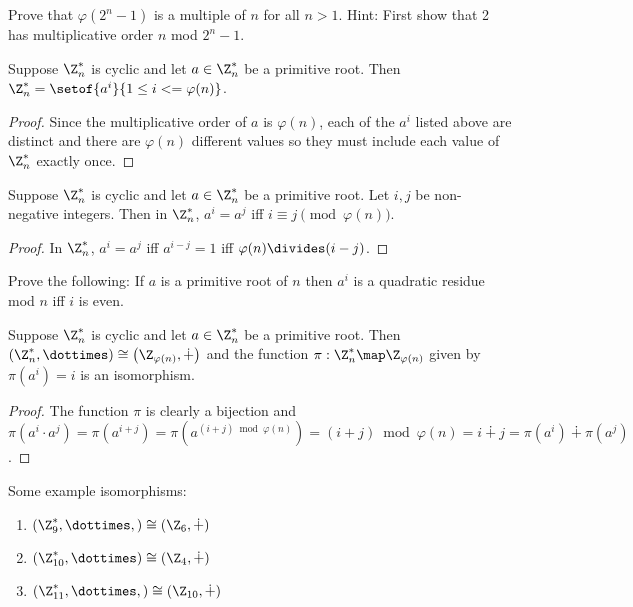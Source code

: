 \documentclass[oneside,12pt]{amsart}
\begin{document}
\begin{homework}
Prove that $\varphi(2^n-1)$ is a multiple of $n$ for all $n>1$.
Hint: First show that 2 has multiplicative order $n$ mod $2^n-1$.
\end{homework}


\begin{lemma}
Suppose $\Z^*_n$ is cyclic and let $a\in\Z^*_n$ be a primitive root. Then $\Z^*_n=\setof{a^i}{1\leq i <= \varphi(n)}$.
\end{lemma}
\begin{proof}
Since the multiplicative order of $a$ is $\varphi(n)$, each of the $a^i$ listed above are distinct and there are $\varphi(n)$ different values so they must include each value of $\Z^*_n$ exactly once.
\end{proof}

\begin{lemma}
Suppose $\Z^*_n$ is cyclic and let $a\in\Z^*_n$ be a primitive root. Let $i,j$ be non-negative integers. Then in $\Z^*_n$, $a^i=a^j$ iff $i\equiv j \pmod {\varphi(n)}$.
\end{lemma}
\begin{proof}
In $\Z^*_n$, $a^i=a^j$ iff $a^{i-j} = 1$ iff $\varphi(n) \divides (i-j)$.
\end{proof}

\begin{homework}
Prove the following: If $a$ is a primitive root of $n$ then $a^i$ is a quadratic residue mod $n$ iff $i$ is even.
\end{homework}

\begin{theorem}
Suppose $\Z^*_n$ is cyclic and let $a\in\Z^*_n$ be a primitive root. Then $\left(\Z^*_n, \dottimes\right ) \cong \left(\Z_{\varphi(n)},\dotplus \right)$
and the function $\pi:\Z^*_n\map\Z_{\varphi(n)}$ given by $\pi(a^i) = i$ is an isomorphism.
\end{theorem}
\begin{proof}
The function $\pi$ is clearly a bijection and $\pi(a^i \cdot a^j) = \pi(a^{i+j}) = \pi(a^{(i+j)\bmod \varphi(n)}) = (i+j)\bmod \varphi(n) = i \dotplus j = \pi(a^i) \dotplus \pi(a^j)$.
\end{proof}

\begin{in_class_example} Some example isomorphisms:
\begin{enumerate}
\item $\left(\Z^*_9, \dottimes, \right) \cong \left(\Z_6, \dotplus \right)$
\item $\left(\Z^*_{10},\dottimes \right) \cong \left(\Z_4, \dotplus \right )$
\item $\left(\Z^*_{11}, \dottimes, \right) \cong \left(\Z_{10}, \dotplus \right)$
\end{enumerate}
\end{in_class_example}
\end{document}
